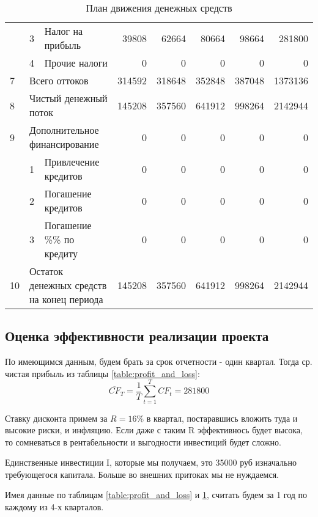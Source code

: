 \begin{table}[!h]
{\begin{tabular}{l|l|l|r|r|r|r|r|}
				& 3 & Налог на прибыль  & 39808 & 62664 & 80664 & 98664 & 281800 \\ \cline{2-8} 
				& 4 & Прочие налоги & 0 & 0 & 0 & 0 & 0 \\ \hline
				\multicolumn{1}{|l|}{7} & \multicolumn{2}{l|}{Всего оттоков} & 314592 & 318648 & 352848 & 387048 & 1373136 \\ \hline
				\multicolumn{1}{|l|}{8} & \multicolumn{2}{l|}{Чистый денежный поток} & 145208 & 357560 & 641912 & 998264 & 2142944 \\ \hline
				\multicolumn{1}{|l|}{9} & \multicolumn{2}{l|}{Дополнительное финансирование} & 0 & 0 & 0 & 0 & 0 \\ \hline
				& 1 & Привлечение кредитов & 0 & 0 & 0 & 0 & 0 \\ \cline{2-8} 
				& 2 & Погашение кредитов & 0 & 0 & 0 & 0 & 0 \\ \cline{2-8} 
				& 3 & Погашение \%\% по кредиту & 0 & 0 & 0 & 0 & 0 \\ \hline
				\multicolumn{1}{|l|}{10} & \multicolumn{2}{l|}{Остаток денежных средств на конец периода} & 145208 & 357560 & 641912 & 998264 & 2142944 \\ \hline
			\end{tabular}
		}
		\caption{План движения денежных средств}
		\label{table:flow_of_funds}
	\end{table}
	
\subsection{Оценка эффективности реализации проекта} \label{subseq:performance}
	По имеющимся данным, будем брать за срок отчетности - один квартал. Тогда ср. чистая прибыль из таблицы  \ref{table:profit_and_loss}:
	\begin{equation}
	\overline{CF}_T = \dfrac{1}{T} \sum_{t = 1}^{T} CF_t = 281800
	\end{equation}
	
	Ставку дисконта примем за $R = 16\%$ в квартал, постаравшись вложить туда и высокие риски, и инфляцию. Если даже с таким R эффективнось будет высока, то сомневаться в рентабельности и выгодности инвестиций будет сложно.
	
	Единственные инвестиции I, которые мы получаем, это 35000 руб изначально требующегося капитала. Больше во внешних притоках мы не нуждаемся.
	
	Имея данные по таблицам \ref{table:profit_and_loss} и \ref{table:flow_of_funds}, считать будем за 1 год по каждому из 4-х кварталов.
